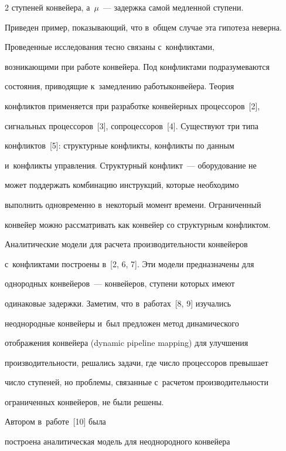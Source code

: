 \begin{multicols}{2}
ступеней конвейера, а~$\mu$~--- задержка самой медленной ступени. 


Приведен пример, показывающий, что в~общем случае эта гипотеза неверна.


  


  Проведенные исследования тесно связаны с~конфликтами, 


возникающими при работе конвейера. Под конфликтами подразумеваются 


со\-стояния, приводящие к~замедлению работы\linebreak конвейера. Тео\-рия 


конфликтов применяется при разработке конвейерных процессоров~[2], 


сигнальных процессоров~[3], сопроцессоров~[4]. Существуют три типа 


конфликтов~[5]: структурные конфликты, конфликты по данным 


и~конфликты управления. Структурный конфликт~--- оборудование не 


может поддержать комбинацию инструкций, которые необходимо 


выполнить одновременно в~некоторый момент времени. Ограниченный 


конвейер можно рассматривать как конвейер со структурным конфликтом. 


Аналитические модели для расчета производительности конвейеров 


с~конфликтами построены в~[2, 6, 7]. Эти модели предназначены для 


однородных конвейеров~--- конвейеров, ступени которых имеют 


одинаковые задержки. Заметим, что в~работах~[8, 9] изучались 


неоднородные конвейеры и~был предложен метод динамического 


отоб\-ра\-же\-ния конвейера (dynamic pipeline mapping) для улучшения 


про\-из\-во\-ди\-тель\-ности, решались задачи, где чис\-ло процессоров превышает 


число ступеней, но проб\-ле\-мы, связанные с~расчетом про\-из\-во\-ди\-тель\-ности 


ограниченных конвейеров, не были решены. 





Автором в~работе~[10] была 


построена аналитическая модель для неоднородного конвейера 



\end{multicols}
